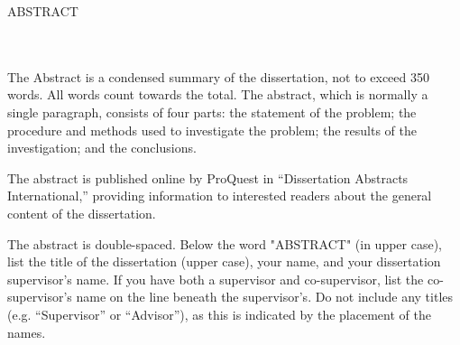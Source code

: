 \begin{center}
	ABSTRACT\\
	\thetitle\\
	\vspace{.5in}
	\theauthor\\
	\theadvisor
\end{center}

\doublespacing
\noindent

The Abstract is a condensed summary of the dissertation, not to exceed 350 words. All words count towards the total. The abstract, which is normally a single paragraph, consists of four parts: the statement of the problem; the procedure and methods used to investigate the problem; the results of the investigation; and the conclusions.

The abstract is published online by ProQuest in “Dissertation Abstracts International,” providing information to interested readers about the general content of the dissertation.

The abstract is double-spaced. Below the word "ABSTRACT" (in upper case), list the title of the dissertation (upper case), your name, and your dissertation supervisor's name. If you have both a supervisor and co-supervisor, list the co-supervisor’s name on the line beneath the supervisor’s. Do not include any titles (e.g. “Supervisor” or “Advisor”), as this is indicated by the placement of the names.
